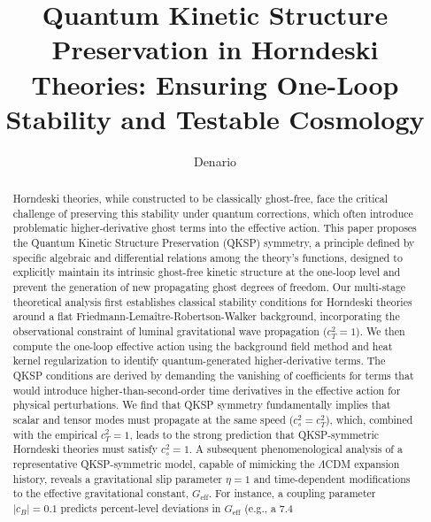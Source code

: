 \documentclass[twocolumn]{aastex631}
\begin{document}
\title{Quantum Kinetic Structure Preservation in Horndeski Theories: Ensuring One-Loop Stability and Testable Cosmology}

\author{Denario}

\begin{abstract}
Horndeski theories, while constructed to be classically ghost-free, face the critical challenge of preserving this stability under quantum corrections, which often introduce problematic higher-derivative ghost terms into the effective action. This paper proposes the Quantum Kinetic Structure Preservation (QKSP) symmetry, a principle defined by specific algebraic and differential relations among the theory's functions, designed to explicitly maintain its intrinsic ghost-free kinetic structure at the one-loop level and prevent the generation of new propagating ghost degrees of freedom. Our multi-stage theoretical analysis first establishes classical stability conditions for Horndeski theories around a flat Friedmann-Lemaître-Robertson-Walker background, incorporating the observational constraint of luminal gravitational wave propagation ($c_T^2=1$). We then compute the one-loop effective action using the background field method and heat kernel regularization to identify quantum-generated higher-derivative terms. The QKSP conditions are derived by demanding the vanishing of coefficients for terms that would introduce higher-than-second-order time derivatives in the effective action for physical perturbations. We find that QKSP symmetry fundamentally implies that scalar and tensor modes must propagate at the same speed ($c_s^2 = c_T^2$), which, combined with the empirical $c_T^2=1$, leads to the strong prediction that QKSP-symmetric Horndeski theories must satisfy $c_s^2=1$. A subsequent phenomenological analysis of a representative QKSP-symmetric model, capable of mimicking the $\Lambda$CDM expansion history, reveals a gravitational slip parameter $\eta=1$ and time-dependent modifications to the effective gravitational constant, $G_{\text{eff}}$. For instance, a coupling parameter $|c_B|=0.1$ predicts percent-level deviations in $G_{\text{eff}}$ (e.g., a 7.4%
\end{abstract}
\end{document}
